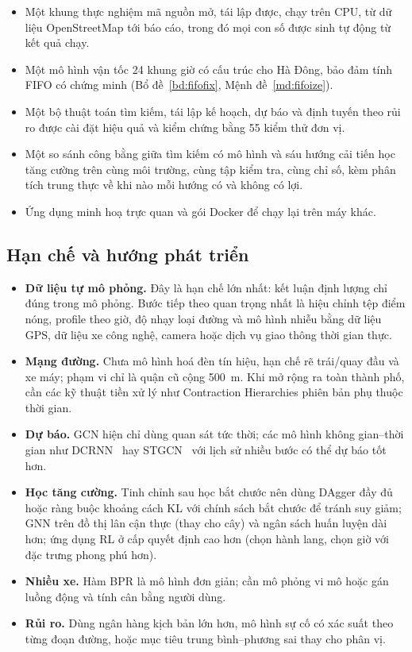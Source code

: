 \begin{itemize}
    \item Một khung thực nghiệm mã nguồn mở, tái lập được, chạy trên CPU, từ dữ liệu OpenStreetMap tới báo cáo, trong đó mọi
    con số được sinh tự động từ kết quả chạy.
    \item Một mô hình vận tốc 24 khung giờ có cấu trúc cho Hà Đông, bảo đảm tính FIFO có chứng minh (Bổ đề~\ref{bd:fifofix},
    Mệnh đề~\ref{md:fifoize}).
    \item Một bộ thuật toán tìm kiếm, tái lập kế hoạch, dự báo và định tuyến theo rủi ro được cài đặt hiệu quả và kiểm chứng
    bằng 55 kiểm thử đơn vị.
    \item Một so sánh công bằng giữa tìm kiếm có mô hình và sáu hướng cải tiến học tăng cường trên cùng môi trường, cùng tập
    kiểm tra, cùng chỉ số, kèm phân tích trung thực về khi nào mỗi hướng có và không có lợi.
    \item Ứng dụng minh hoạ trực quan và gói Docker để chạy lại trên máy khác.
\end{itemize}

\subsection{Hạn chế và hướng phát triển}\label{sec:conclusion:future}

\begin{itemize}
    \item \textbf{Dữ liệu tự mô phỏng.} Đây là hạn chế lớn nhất: kết luận định lượng chỉ đúng trong mô phỏng. Bước tiếp theo
    quan trọng nhất là hiệu chỉnh tệp điểm nóng, profile theo giờ, độ nhạy loại đường và mô hình nhiễu bằng dữ liệu GPS, dữ
    liệu xe công nghệ, camera hoặc dịch vụ giao thông thời gian thực.
    \item \textbf{Mạng đường.} Chưa mô hình hoá đèn tín hiệu, hạn chế rẽ trái/quay đầu và xe máy; phạm vi chỉ là quận cũ cộng
    500~m. Khi mở rộng ra toàn thành phố, cần các kỹ thuật tiền xử lý như Contraction Hierarchies phiên bản phụ thuộc thời gian.
    \item \textbf{Dự báo.} GCN hiện chỉ dùng quan sát tức thời; các mô hình không gian--thời gian như DCRNN~\cite{li2018dcrnn}
    hay STGCN~\cite{yu2018stgcn} với lịch sử nhiều bước có thể dự báo tốt hơn.
    \item \textbf{Học tăng cường.} Tinh chỉnh sau học bắt chước nên dùng DAgger đầy đủ hoặc ràng buộc khoảng cách KL với chính
    sách bắt chước để tránh suy giảm; GNN trên đồ thị lân cận thực (thay cho cây) và ngân sách huấn luyện dài hơn; ứng dụng RL
    ở cấp quyết định cao hơn (chọn hành lang, chọn giờ với đặc trưng phong phú hơn).
    \item \textbf{Nhiều xe.} Hàm BPR là mô hình đơn giản; cần mô phỏng vi mô hoặc gán luồng động và tính cân bằng người dùng.
    \item \textbf{Rủi ro.} Dùng ngân hàng kịch bản lớn hơn, mô hình sự cố có xác suất theo từng đoạn đường, hoặc mục tiêu
    trung bình--phương sai thay cho phân vị.
\end{itemize}
